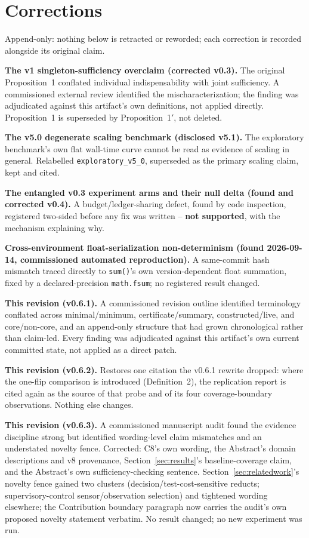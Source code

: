 \documentclass[11pt,a4paper]{article}
\theoremstyle{definition}
\begin{document}
\section{Corrections}
\label{sec:corrections}

Append-only: nothing below is retracted or reworded; each correction is recorded alongside its original claim.

\noindent\textbf{The v1 singleton-sufficiency overclaim (corrected v0.3).} The original Proposition~1 conflated individual indispensability with joint sufficiency. A commissioned external review identified the mischaracterization; the finding was adjudicated against this artifact's own definitions, not applied directly. Proposition~1 is superseded by Proposition~1$'$, not deleted.

\noindent\textbf{The v5.0 degenerate scaling benchmark (disclosed v5.1).} The exploratory benchmark's own flat wall-time curve cannot be read as evidence of scaling in general. Relabelled \texttt{exploratory\_v5\_0}, superseded as the primary scaling claim, kept and cited.

\noindent\textbf{The entangled v0.3 experiment arms and their null delta (found and corrected v0.4).} A budget/ledger-sharing defect, found by code inspection, registered two-sided before any fix was written -- \textbf{not supported}, with the mechanism explaining why.

\noindent\textbf{Cross-environment float-serialization non-determinism (found 2026-09-14, commissioned automated reproduction).} A same-commit hash mismatch traced directly to \texttt{sum()}'s own version-dependent float summation, fixed by a declared-precision \texttt{math.fsum}; no registered result changed.

\noindent\textbf{This revision (v0.6.1).} A commissioned revision outline identified terminology conflated across minimal/minimum, certificate/summary, constructed/live, and core/non-core, and an append-only structure that had grown chronological rather than claim-led. Every finding was adjudicated against this artifact's own current committed state, not applied as a direct patch.

\noindent\textbf{This revision (v0.6.2).} Restores one citation the v0.6.1 rewrite dropped: where the one-flip comparison is introduced (Definition~2), the replication report is cited again as the source of that probe and of its four coverage-boundary observations. Nothing else changes.

\noindent\textbf{This revision (v0.6.3).} A commissioned manuscript audit found the evidence discipline strong but identified wording-level claim mismatches and an understated novelty fence. Corrected: C8's own wording, the Abstract's domain descriptions and v8 provenance, Section~\ref{sec:results}'s baseline-coverage claim, and the Abstract's own sufficiency-checking sentence. Section~\ref{sec:relatedwork}'s novelty fence gained two clusters (decision/test-cost-sensitive reducts; supervisory-control sensor/observation selection) and tightened wording elsewhere; the Contribution boundary paragraph now carries the audit's own proposed novelty statement verbatim. No result changed; no new experiment was run.
\end{document}
